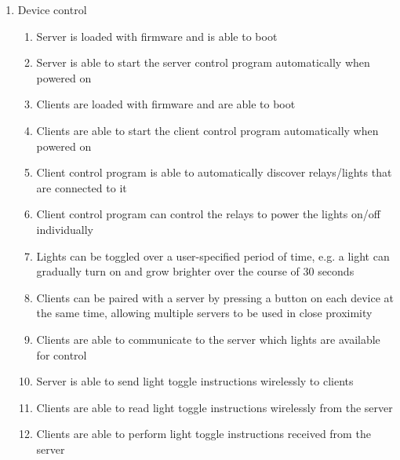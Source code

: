 \documentclass[12pt]{article}
\begin{document}
\begin{enumerate}
    \item Device control
        \begin{enumerate}
            \item Server is loaded with firmware and is able to boot
            \item Server is able to start the server control program automatically when powered on
            \item Clients are loaded with firmware and are able to boot
            \item Clients are able to start the client control program automatically when powered on
            \item Client control program is able to automatically discover relays/lights that are connected to it
            \item Client control program can control the relays to power the lights on/off individually
            \item Lights can be toggled over a user-specified period of time, e.g. a light can gradually turn on and grow brighter over the course of 30 seconds
            \item Clients can be paired with a server by pressing a button on each device at the same time, allowing multiple servers to be used in close proximity
            \item Clients are able to communicate to the server which lights are available for control
            \item Server is able to send light toggle instructions wirelessly to clients
            \item Clients are able to read light toggle instructions wirelessly from the server
            \item Clients are able to perform light toggle instructions received from the server
        \end{enumerate}


\end{enumerate}
\end{document}
